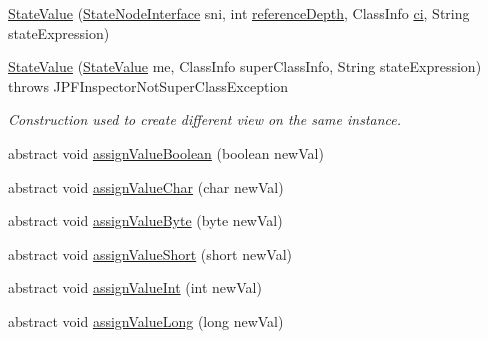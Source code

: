 \begin{DoxyCompactItemize}
\item 
\hyperlink{classgov_1_1nasa_1_1jpf_1_1inspector_1_1server_1_1programstate_1_1_state_value_aef9d3691f1dd70f6458c47ce8bc6943c}{State\+Value} (\hyperlink{interfacegov_1_1nasa_1_1jpf_1_1inspector_1_1server_1_1programstate_1_1_state_node_interface}{State\+Node\+Interface} sni, int \hyperlink{classgov_1_1nasa_1_1jpf_1_1inspector_1_1server_1_1programstate_1_1_state_node_a55683618625dae46e8aa68d95811d6bb}{reference\+Depth}, Class\+Info \hyperlink{classgov_1_1nasa_1_1jpf_1_1inspector_1_1server_1_1programstate_1_1_state_value_a0eb4aa1e630ed6372dcfb8c41ae7edc5}{ci}, String state\+Expression)
\item 
\hyperlink{classgov_1_1nasa_1_1jpf_1_1inspector_1_1server_1_1programstate_1_1_state_value_ad694db75521a2bc40b13feceb7f1d7fd}{State\+Value} (\hyperlink{classgov_1_1nasa_1_1jpf_1_1inspector_1_1server_1_1programstate_1_1_state_value}{State\+Value} me, Class\+Info super\+Class\+Info, String state\+Expression)  throws J\+P\+F\+Inspector\+Not\+Super\+Class\+Exception 
\begin{DoxyCompactList}\small\item\em Construction used to create different view on the same instance. \end{DoxyCompactList}\item 
abstract void \hyperlink{classgov_1_1nasa_1_1jpf_1_1inspector_1_1server_1_1programstate_1_1_state_value_af9274e614eeb314bc9a4d9a3ab12a933}{assign\+Value\+Boolean} (boolean new\+Val)
\item 
abstract void \hyperlink{classgov_1_1nasa_1_1jpf_1_1inspector_1_1server_1_1programstate_1_1_state_value_a6027b0c6bf20af747ed660f1f2297c47}{assign\+Value\+Char} (char new\+Val)
\item 
abstract void \hyperlink{classgov_1_1nasa_1_1jpf_1_1inspector_1_1server_1_1programstate_1_1_state_value_a9c869f383dd1a80b8f4c7458226f9b19}{assign\+Value\+Byte} (byte new\+Val)
\item 
abstract void \hyperlink{classgov_1_1nasa_1_1jpf_1_1inspector_1_1server_1_1programstate_1_1_state_value_a4c3c57146832c747f348c1770fe8e93f}{assign\+Value\+Short} (short new\+Val)
\item 
abstract void \hyperlink{classgov_1_1nasa_1_1jpf_1_1inspector_1_1server_1_1programstate_1_1_state_value_a450cdffb07624deaf98dd9b52b037429}{assign\+Value\+Int} (int new\+Val)
\item 
abstract void \hyperlink{classgov_1_1nasa_1_1jpf_1_1inspector_1_1server_1_1programstate_1_1_state_value_aea5c907a2944b000680439d2a6148c9f}{assign\+Value\+Long} (long new\+Val)

\end{DoxyCompactItemize}
